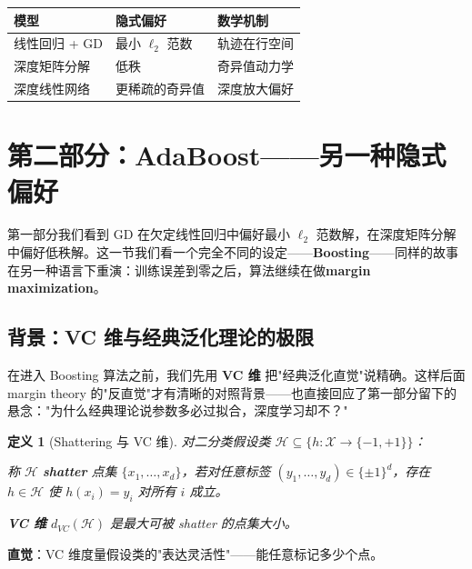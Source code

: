 \documentclass[12pt, a4paper]{ctexart}
\newtheorem{definition}[theorem]{定义}
\begin{document}
\begin{keypoint}[隐式正则化的谱系]
\begin{center}
\begin{tabular}{lll}
\toprule
\textbf{模型} & \textbf{隐式偏好} & \textbf{数学机制} \\
\midrule
线性回归 + GD & 最小 $\ell_2$ 范数 & 轨迹在行空间 \\
深度矩阵分解 & 低秩 & 奇异值动力学 \\
深度线性网络 & 更稀疏的奇异值 & 深度放大偏好 \\
\bottomrule
\end{tabular}
\end{center}
\end{keypoint}


\section{第二部分：AdaBoost——另一种隐式偏好}

第一部分我们看到 GD 在欠定线性回归中偏好最小 $\ell_2$ 范数解，在深度矩阵分解中偏好低秩解。这一节我们看一个完全不同的设定——\textbf{Boosting}——同样的故事在另一种语言下重演：训练误差到零之后，算法继续在做\textbf{margin maximization}。

\subsection{背景：VC 维与经典泛化理论的极限}

在进入 Boosting 算法之前，我们先用 \textbf{VC 维} 把"经典泛化直觉"说精确。这样后面 margin theory 的"反直觉"才有清晰的对照背景——也直接回应了第一部分留下的悬念："为什么经典理论说参数多必过拟合，深度学习却不？"

\begin{definition}[Shattering 与 VC 维]
对二分类假设类 $\mathcal{H} \subseteq \{h: \mathcal{X} \to \{-1, +1\}\}$：

称 $\mathcal{H}$ \textbf{shatter} 点集 $\{x_1, \ldots, x_d\}$，若对任意标签 $(y_1, \ldots, y_d) \in \{\pm 1\}^d$，存在 $h \in \mathcal{H}$ 使 $h(x_i) = y_i$ 对所有 $i$ 成立。

\textbf{VC 维} $d_{VC}(\mathcal{H})$ 是最大可被 shatter 的点集大小。
\end{definition}

\textbf{直觉}：VC 维度量假设类的"表达灵活性"——能任意标记多少个点。
\end{document}
